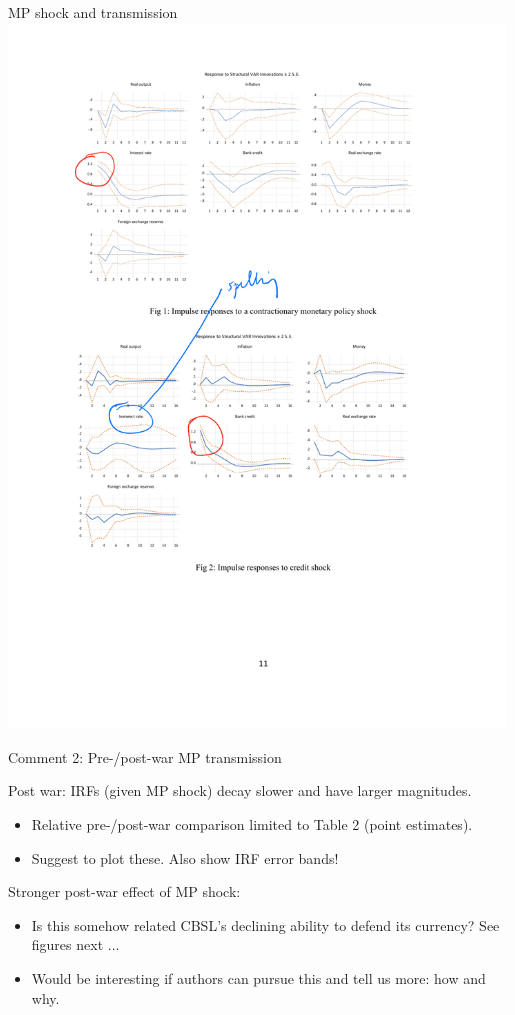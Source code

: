 \documentclass[10pt,english,slidetop,compress,
              blue,mathserif,color=option]{beamer}
\theoremstyle{plain}
\theoremstyle{definition}
\begin{document}
\begin{frame}{MP shock and transmission}
  \includegraphics[width=0.99\textwidth]{figures/MP-shock.pdf}
\end{frame}


\begin{frame}{Comment 2: Pre-/post-war MP transmission}

  Post war: IRFs (given MP shock) decay slower and have larger magnitudes.
    \begin{itemize}
      \item Relative pre-/post-war comparison limited to Table 2 (point estimates).
      \item Suggest to plot these. Also show IRF error bands!
    \end{itemize}  

  Stronger post-war effect of MP shock:
    \begin{itemize}
      \item Is this somehow related CBSL's declining ability to defend its currency? See figures next ... 
      \item Would be interesting if authors can pursue this and tell us more: how and why.
    \end{itemize}

\end{frame}
\end{document}
